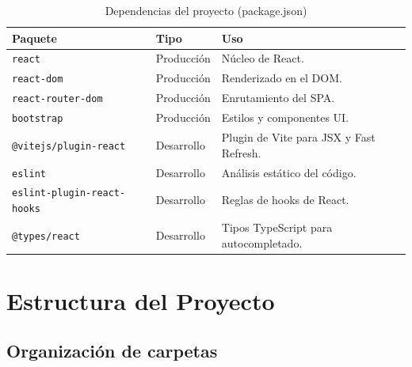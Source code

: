 \documentclass[10pt,letterpaper]{report}
\begin{document}
\begin{table}[H]
\centering
\caption{Dependencias del proyecto (package.json)}
\label{tab:dependencias}
\begin{tabular}{p{} p{} p{}}
\toprule
\textbf{Paquete} & \textbf{Tipo} & \textbf{Uso} \\
\midrule
\texttt{react} & Producción & Núcleo de React. \\
\texttt{react-dom} & Producción & Renderizado en el DOM. \\
\texttt{react-router-dom} & Producción & Enrutamiento del SPA. \\
\texttt{bootstrap} & Producción & Estilos y componentes UI. \\
\texttt{@vitejs/plugin-react} & Desarrollo & Plugin de Vite para JSX y Fast Refresh. \\
\texttt{eslint} & Desarrollo & Análisis estático del código. \\
\texttt{eslint-plugin-react-hooks} & Desarrollo & Reglas de hooks de React. \\
\texttt{@types/react} & Desarrollo & Tipos TypeScript para autocompletado. \\
\bottomrule
\end{tabular}
\end{table}

\chapter{Estructura del Proyecto}

\section{Organización de carpetas}
\end{document}
